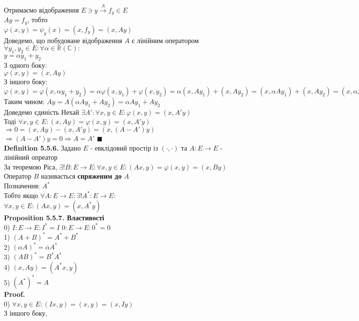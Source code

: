 \documentclass[a4paper, 14pt]{extarticle}
\def\defin#1{\textbf{Definition {#1}}}
\def\prp#1{\textbf{Proposition {#1}}}
\def\proof{\textbf{Proof.}\\}
\def\bigline{\vspace{5mm}\\}
\def\qed{$\blacksquare$}
\begin{document}
Отримаємо відображення $E \ni y \overset{A}{\to} f_y \in E$\\
$Ay = f_y$, тобто\\
$\varphi(x,y) = \psi_y(x) = (x,f_y) = (x, Ay)$
\bigline
Доведемо, що побудоване відображення $A$ є лінійним оператором\\
$\forall y_1, y_2 \in E: \forall \alpha \in \mathbb{R} (\mathbb{C}):$\\
$y = \alpha y_1 + y_2$\\
З одного боку:\\
$\varphi(x,y) = (x,Ay)$\\
З іншого боку:\\
$\varphi(x,y) = \varphi(x, \alpha y_1 + y_2) = \alpha \varphi(x,y_1) + \varphi(x,y_2) = \alpha(x,Ay_1) + (x, Ay_2) = (x, \alpha Ay_1) + (x, Ay_2) = (x, \alpha Ay_1 + Ay_2)$\\
Таким чином: $Ay = A(\alpha Ay_1 + Ay_2) = \alpha Ay_1 + Ay_2$
\bigline
Доведемо єдиність
Нехай $\exists A': \forall x,y \in E: \varphi(x,y) = (x,A'y)$\\
Тоді $\forall x,y \in E: (x, Ay) = \varphi(x,y) = (x, A'y)$\\
$\Rightarrow 0 = (x,Ay) - (x,A'y) = (x,(A-A')y)$\\
$\Rightarrow (A - A')y=0 \Rightarrow A=A'$ \qed
\bigline
\defin{5.5.6.} Задано $E$ - евклідовий простір із $(\cdot, \cdot)$ та $A: E \to E$ - лінійний опреатор\\
За теоремою Ріса, $\exists !B: E \to E: \forall x,y \in E: (Ax,y) = \varphi(x,y) = (x,By)$\\
Оператор $B$ називається \textbf{спряженим до} $A$\\
Позначення: $A^*$\\
Тобто якщо $\forall A: E \to E: \exists! A^*: E \to E:$\\
$\forall x,y \in E: (Ax,y)=(x,A^*y)$
\bigline
\prp{5.5.7. Властивості}\\
0) $I: E \to E: I^* = I$ \hspace{1cm} $0: E \to E: 0^* = 0$\\
1) $(A+B)^* = A^* + B^*$\\
2) $(\alpha A)^* = \overline{\alpha} A^*$\\
3) $(AB)^* = B^* A^*$\\
4) $(x,Ay) = (A^*x,y)$\\
5) $(A^*)^* = A$\\
\proof
0) $\forall x,y \in E: (Ix,y) = (x,y) = (x, Iy)$\\
З іншого боку,\\
\end{document}
